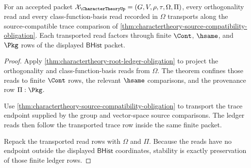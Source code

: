 \begin{theorem}
\label{thm:charactertheory-trace-transport-stability}
For an accepted packet $\mathcal X_{\CharacterTheoryUp}=(G,V,\rho,\tau,\Omega,\Pi)$, every orthogonality read and every class-function-basis read recorded in $\Omega$ transports along the source-compatible trace comparison of \autoref{thm:charactertheory-source-compatibility-obligation}. Each transported read factors through finite $\Cont$, $\hsame$, and $\Pkg$ rows of the displayed $\mathsf{BHist}$ packet.
\end{theorem}
\begin{proof}
Apply \autoref{thm:charactertheory-root-ledger-obligation} to project the orthogonality and class-function-basis reads from $\Omega$. The theorem confines those reads to finite $\Cont$ rows, the relevant $\hsame$ comparisons, and the provenance row $\Pi:\Pkg$.

Use \autoref{thm:charactertheory-source-compatibility-obligation} to transport the trace endpoint supplied by the group and vector-space source comparisons. The ledger reads then follow the transported trace row inside the same finite packet.

Repack the transported read rows with $\Omega$ and $\Pi$. Because the reads have no endpoint outside the displayed $\mathsf{BHist}$ coordinates, stability is exactly preservation of those finite ledger rows.
\end{proof}

